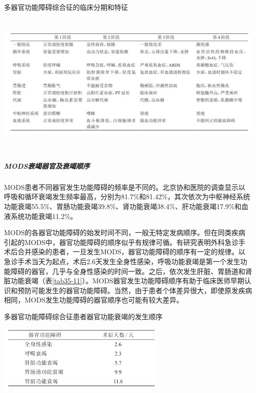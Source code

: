 \begin{table}[htbp]
\centering
\caption{多器官功能障碍综合征的临床分期和特征}
\label{tab35-10}
\includegraphics[width=6.73958in,height=2.76042in]{./images/Image00142.jpg}
\end{table}

\subparagraph{MODS衰竭器官及衰竭顺序}

MODS患者不同器官发生功能障碍的频率是不同的。北京协和医院的调查显示以呼吸和循环衰竭发生频率最高，分别为81.7\%和81.42\%，其次依次为中枢神经系统功能衰竭55.5\%、胃肠功能衰竭39.8\%、肾功能衰竭38.4\%、肝功能衰竭17.9\%和血液系统功能衰竭11.2\%。

MODS的各器官功能障碍的始发时间不同，一般无特定发病顺序。但在同类疾病引起的MODS中，器官功能障碍的顺序似乎有规律可循。有研究表明外科急诊手术后合并感染的患者，一旦发生MODS，器官功能障碍的顺序有一定的规律。以急诊手术当天为起点，术后2.6天发生全身性感染，呼吸功能衰竭是第一个发生功能障碍的器官，几乎与全身性感染的时间一致。之后，依次发生肝脏、胃肠道和肾脏功能衰竭（表\ref{tab35-11}）。MODS器官发生功能障碍顺序有助于临床医师早期认识和预防可能发生的器官功能障碍。当然，由于患者个体差异很大，即使原发疾病相同，MODS发生功能障碍的器官顺序也可能有较大差异。

\begin{table}[htbp]
\centering
\caption{多器官功能障碍综合征患者器官功能衰竭的发生顺序}
\label{tab35-11}
\includegraphics[width=3.26042in,height=1.29167in]{./images/Image00143.jpg}
\end{table}

